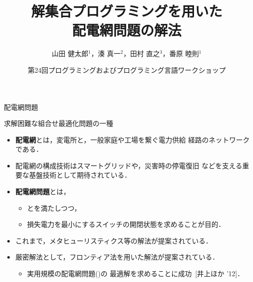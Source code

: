 \documentclass[dvipdfmx,11pt]{beamer}
\title{解集合プログラミングを用いた\\配電網問題の解法}
\author[山田 健太郎，湊 真一，田村 直之，番原 睦則]
{山田 健太郎$^1$，湊 真一$^2$，田村 直之$^3$，番原 睦則$^1$}
\date{第24回プログラミングおよびプログラミング言語ワークショップ}
\institute{1.名古屋大学 大学院情報学研究科\\
2.京都大学 大学院情報学研究科\\
3.神戸大学 情報基盤センター
}
\begin{document}
\begin{frame}{}
  \titlepage
\end{frame}

\begin{frame}{配電網問題}
  \begin{alertblock}{}\centering
    求解困難な組合せ最適化問題の一種
  \end{alertblock}
  \vfill
  \begin{itemize}
  \item \alert{\bf 配電網}とは，変電所と，一般家庭や工場を繋ぐ電力供給
    経路のネットワークである．
  \item  配電網の構成技術はスマートグリッドや，災害時の停電復旧
         などを支える重要な基盤技術として期待されている．
  \item \alert{\bf 配電網問題}とは，
    \begin{itemize}
    \item {}とを満たしつつ，
    \item 損失電力を最小にするスイッチの開閉状態を求めることが目的．
    \end{itemize}
  \item これまで，メタヒューリスティクス等の解法が提案されている．
  \item 厳密解法として，フロンティア法を用いた解法が提案されている．
    \begin{itemize}
    \item 実用規模の配電網問題()の
      最適解を求めることに成功~[井上ほか '12]．
    \end{itemize}
  \end{itemize}
\end{frame}
\end{document}
